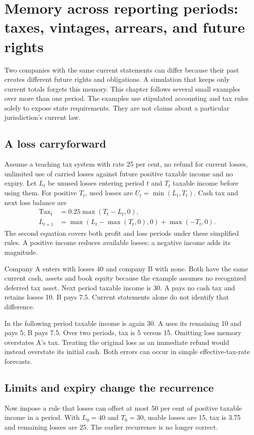 \chapter[Memory across several reporting periods]{Memory across reporting periods: taxes, vintages, arrears, and future rights}
\label{sim:memory-case}

Two companies with the same current statements can differ because their past creates different future rights and obligations. A simulation that keeps only current totals forgets this memory. This chapter follows several small examples over more than one period. The examples use stipulated accounting and tax rules solely to expose state requirements. They are not claims about a particular jurisdiction's current law.

\section{A loss carryforward}
Assume a teaching tax system with rate 25 per cent, no refund for current losses, unlimited use of carried losses against future positive taxable income and no expiry. Let $L_t$ be unused losses entering period $t$ and $T_t$ taxable income before using them. For positive $T_t$, used losses are $U_t=\min(L_t,T_t)$. Cash tax and next loss balance are
\begin{align}
 \operatorname{Tax}_t&=0.25\max(T_t-L_t,0),\\
 L_{t+1}&=\max(L_t-\max(T_t,0),0)+\max(-T_t,0).
\end{align}
The second equation covers both profit and loss periods under these simplified rules. A positive income reduces available losses; a negative income adds its magnitude.

Company A enters with losses 40 and company B with none. Both have the same current cash, assets and book equity because the example assumes no recognized deferred tax asset. Next period taxable income is 30. A pays no cash tax and retains losses 10. B pays 7.5. Current statements alone do not identify that difference.

In the following period taxable income is again 30. A uses its remaining 10 and pays 5; B pays 7.5. Over two periods, tax is 5 versus 15. Omitting loss memory overstates A's tax. Treating the original loss as an immediate refund would instead overstate its initial cash. Both errors can occur in simple effective-tax-rate forecasts.

\section{Limits and expiry change the recurrence}
Now impose a rule that losses can offset at most 50 per cent of positive taxable income in a period. With $L_0=40$ and $T_0=30$, usable losses are 15, tax is 3.75 and remaining losses are 25. The earlier recurrence is no longer correct.

